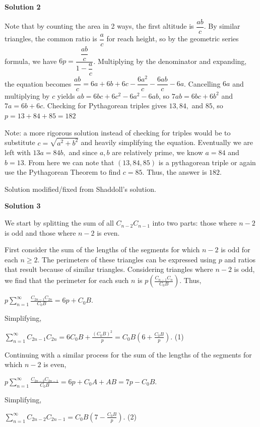 \begin{enumerate}
\textbf{Solution 2}

Note that by counting the area in 2 ways, the first altitude is $\dfrac{ab}{c}$. By similar triangles, the common ratio is $\dfrac{a}{c}$ for reach height, so by the geometric series formula, we have $6p=\dfrac{\dfrac{ab}{c}}{1-\dfrac{a}{c}}$. Multiplying by the denominator and expanding, the equation becomes $\dfrac{ab}{c}=6a+6b+6c-\dfrac{6a^2}{c}-\dfrac{6ab}{c}-6a$. Cancelling $6a$ and multiplying by $c$ yields $ab=6bc+6c^2-6a^2-6ab$, so $7ab = 6bc+6b^2$ and $7a=6b+6c$. Checking for Pythagorean triples gives $13,84,$ and $85$, so $p=13+84+85=\boxed{182}$

 Note: a more rigorous solution instead of checking for triples would be to substitute $c = \sqrt{a^2 + b^2}$ and heavily simplifying the equation. Eventually we are left with $13a = 84b,$ and since $a, b$ are relatively prime, we know $a = 84$ and $b = 13.$ From here we can note that $(13, 84, 85)$ is a pythagorean triple or again use the Pythagorean Theorem to find $c = 85.$ Thus, the answer is $\boxed{182}.$

 Solution modified/fixed from Shaddoll's solution.

 



\textbf{Solution 3}

We start by splitting the sum of all $C_{n-2}C_{n-1}$ into two parts: those where $n-2$ is odd and those where $n-2$ is even.

 
First consider the sum of the lengths of the segments for which $n-2$ is odd for each $n\geq2$. The perimeters of these triangles can be expressed using $p$ and ratios that result because of similar triangles. Considering triangles where $n-2$ is odd, we find that the perimeter for each such $n$ is $p\left(\frac{C_{n-1}C_{n}}{C_{0}B}\right)$. Thus, 

 $p\sum_{n=1}^{\infty}\frac{C_{2n-1}C_{2n}}{C_{0}B}=6p+C_{0}B$.

 
Simplifying,

 $\sum_{n=1}^{\infty}C_{2n-1}C_{2n}=6C_{0}B + \frac{(C_{0}B)^2}{p}=C_{0}B\left(6+\frac{C_{0}B}{p}\right)$.     (1)

 
Continuing with a similar process for the sum of the lengths of the segments for which $n-2$ is even,

 $p\sum_{n=1}^{\infty}\frac{C_{2n-2}C_{2n-1}}{C_{0}B}=6p+C_{0}A+AB=7p-C_{0}B$.

 
Simplifying,

 $\sum_{n=1}^{\infty}C_{2n-2}C_{2n-1}=C_{0}B\left(7-\frac{C_{0}B}{p}\right)$.     (2)


\end{enumerate}
